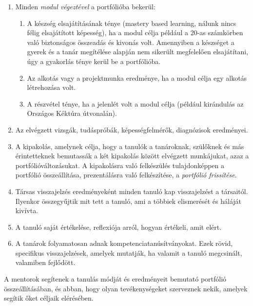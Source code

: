\begin{enumerate}
\item Minden \emph{modul végeztével} a portfólióba bekerül:

\begin{enumerate}

\item  A készség elsajátításának ténye (mastery based learning, nálunk nincs félig elsajátított képesség), ha a modul célja például a 20-as számkörben való biztonságos összeadás és kivonás volt. Amennyiben a készséget a gyerek és a tanár megítélése alapján nem sikerült megfelelően elsajátítani, úgy a gyakorlás ténye kerül be a portfólióba.

\item Az alkotás vagy a projektmunka eredménye, ha a modul célja egy alkotás létrehozása volt.

\item A részvétel ténye, ha a jelenlét volt a modul célja (például kirándulás az Országos Kéktúra útvonalán).


\end{enumerate}
\item Az elvégzett vizsgák, tudáspróbák, képességfelmérők, diagnózisok eredményei.

\item A kipakolás, amelynek célja, hogy a tanulók a tanároknak, szülőknek és más érintetteknek bemutassák a két kipakolás között elvégzett munkájukat, azaz a portfólióváltozásukat. A kipakolásra való felkészülés tulajdonképpen a portfólió összeállítása, prezentálásra való felkészítése, a \emph{portfólió frissítése}.

\item Társas visszajelzés eredményeként minden tanuló kap visszajelzést a társaitól. Ilyenkor összegyűjtik mit tett a tanuló, ami a többiek elismerését és háláját kivívta.

\item A tanuló saját értékelése, reflexiója arról, hogyan értékeli, amit elért.

\item A tanárok folyamatosan adnak kompetenciatanúsítványokat. Ezek rövid, specifikus visszajelzések, amelyek mutatják, ha valamit a tanuló megcsinált, valamiben fejlődött.
\end{enumerate}

A mentorok segítenek a tanulás módját és eredményeit bemutató portfólió összeállításában, és abban, hogy olyan tevékenységeket szerveznek nekik, amelyek segítik őket céljaik elérésében.

